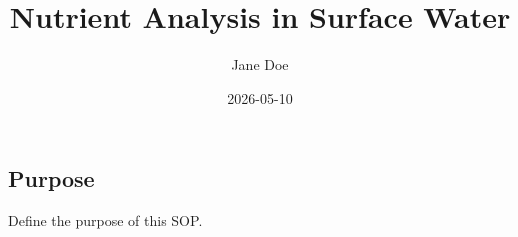 \documentclass[
]{lab-sop-v05}
\title{Nutrient Analysis in Surface Water}
\author{Jane Doe}
\date{2026-05-10}
\begin{document}
\maketitle


\subsection{Purpose}\label{purpose}

Define the purpose of this SOP.
\end{document}
